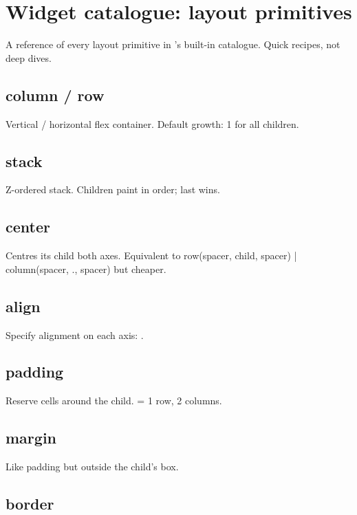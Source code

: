 \chapter{Widget catalogue: layout primitives}
\label{ch:catalogue_layout}

\begin{aside}
A reference of every layout primitive in \maya{}'s built-in
catalogue. Quick recipes, not deep dives.
\end{aside}

\section{column / row}

Vertical / horizontal flex container. Default growth: 1
for all children.

\section{stack}

Z-ordered stack. Children paint in order; last wins.

\section{center}

Centres its child both axes. Equivalent to row(spacer,
child, spacer) | column(spacer, ., spacer) but cheaper.

\section{align}

Specify alignment on each axis:
.

\section{padding}

Reserve cells around the child.  =
1 row, 2 columns.

\section{margin}

Like padding but outside the child's box.

\section{border}

